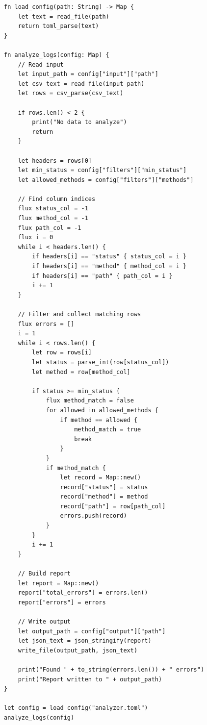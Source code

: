 \begin{lstlisting}[language=Lattice, caption={A configuration-driven log analyzer}]
fn load_config(path: String) -> Map {
    let text = read_file(path)
    return toml_parse(text)
}

fn analyze_logs(config: Map) {
    // Read input
    let input_path = config["input"]["path"]
    let csv_text = read_file(input_path)
    let rows = csv_parse(csv_text)

    if rows.len() < 2 {
        print("No data to analyze")
        return
    }

    let headers = rows[0]
    let min_status = config["filters"]["min_status"]
    let allowed_methods = config["filters"]["methods"]

    // Find column indices
    flux status_col = -1
    flux method_col = -1
    flux path_col = -1
    flux i = 0
    while i < headers.len() {
        if headers[i] == "status" { status_col = i }
        if headers[i] == "method" { method_col = i }
        if headers[i] == "path" { path_col = i }
        i += 1
    }

    // Filter and collect matching rows
    flux errors = []
    i = 1
    while i < rows.len() {
        let row = rows[i]
        let status = parse_int(row[status_col])
        let method = row[method_col]

        if status >= min_status {
            flux method_match = false
            for allowed in allowed_methods {
                if method == allowed {
                    method_match = true
                    break
                }
            }
            if method_match {
                let record = Map::new()
                record["status"] = status
                record["method"] = method
                record["path"] = row[path_col]
                errors.push(record)
            }
        }
        i += 1
    }

    // Build report
    let report = Map::new()
    report["total_errors"] = errors.len()
    report["errors"] = errors

    // Write output
    let output_path = config["output"]["path"]
    let json_text = json_stringify(report)
    write_file(output_path, json_text)

    print("Found " + to_string(errors.len()) + " errors")
    print("Report written to " + output_path)
}

let config = load_config("analyzer.toml")
analyze_logs(config)
\end{lstlisting}


